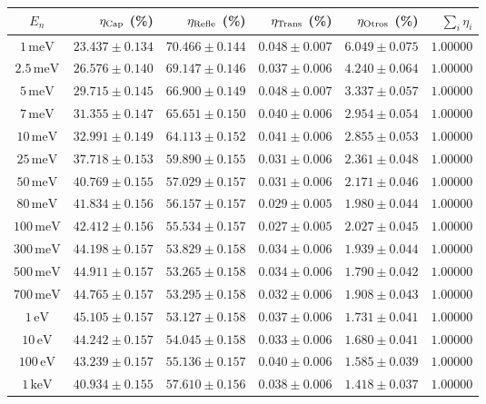\begin{tabular}{crrrrr}
\toprule
$E_n$ & $\eta_{\rm Cap}$ (\%) & $\eta_{\rm Refle}$ (\%) & $\eta_{\rm Trans}$ (\%) & $\eta_{\rm Otros}$ (\%) & $\sum_i \eta_i$ \\
\midrule
$1\,\mathrm{meV}$ & $23.437\pm0.134$ & $70.466\pm0.144$ & $0.048\pm0.007$ & $6.049\pm0.075$ & $1.00000$ \\
$2.5\,\mathrm{meV}$ & $26.576\pm0.140$ & $69.147\pm0.146$ & $0.037\pm0.006$ & $4.240\pm0.064$ & $1.00000$ \\
$5\,\mathrm{meV}$ & $29.715\pm0.145$ & $66.900\pm0.149$ & $0.048\pm0.007$ & $3.337\pm0.057$ & $1.00000$ \\
$7\,\mathrm{meV}$ & $31.355\pm0.147$ & $65.651\pm0.150$ & $0.040\pm0.006$ & $2.954\pm0.054$ & $1.00000$ \\
$10\,\mathrm{meV}$ & $32.991\pm0.149$ & $64.113\pm0.152$ & $0.041\pm0.006$ & $2.855\pm0.053$ & $1.00000$ \\
$25\,\mathrm{meV}$ & $37.718\pm0.153$ & $59.890\pm0.155$ & $0.031\pm0.006$ & $2.361\pm0.048$ & $1.00000$ \\
$50\,\mathrm{meV}$ & $40.769\pm0.155$ & $57.029\pm0.157$ & $0.031\pm0.006$ & $2.171\pm0.046$ & $1.00000$ \\
$80\,\mathrm{meV}$ & $41.834\pm0.156$ & $56.157\pm0.157$ & $0.029\pm0.005$ & $1.980\pm0.044$ & $1.00000$ \\
$100\,\mathrm{meV}$ & $42.412\pm0.156$ & $55.534\pm0.157$ & $0.027\pm0.005$ & $2.027\pm0.045$ & $1.00000$ \\
$300\,\mathrm{meV}$ & $44.198\pm0.157$ & $53.829\pm0.158$ & $0.034\pm0.006$ & $1.939\pm0.044$ & $1.00000$ \\
$500\,\mathrm{meV}$ & $44.911\pm0.157$ & $53.265\pm0.158$ & $0.034\pm0.006$ & $1.790\pm0.042$ & $1.00000$ \\
$700\,\mathrm{meV}$ & $44.765\pm0.157$ & $53.295\pm0.158$ & $0.032\pm0.006$ & $1.908\pm0.043$ & $1.00000$ \\
$1\,\mathrm{eV}$ & $45.105\pm0.157$ & $53.127\pm0.158$ & $0.037\pm0.006$ & $1.731\pm0.041$ & $1.00000$ \\
$10\,\mathrm{eV}$ & $44.242\pm0.157$ & $54.045\pm0.158$ & $0.033\pm0.006$ & $1.680\pm0.041$ & $1.00000$ \\
$100\,\mathrm{eV}$ & $43.239\pm0.157$ & $55.136\pm0.157$ & $0.040\pm0.006$ & $1.585\pm0.039$ & $1.00000$ \\
$1\,\mathrm{keV}$ & $40.934\pm0.155$ & $57.610\pm0.156$ & $0.038\pm0.006$ & $1.418\pm0.037$ & $1.00000$ \\

\end{tabular}
